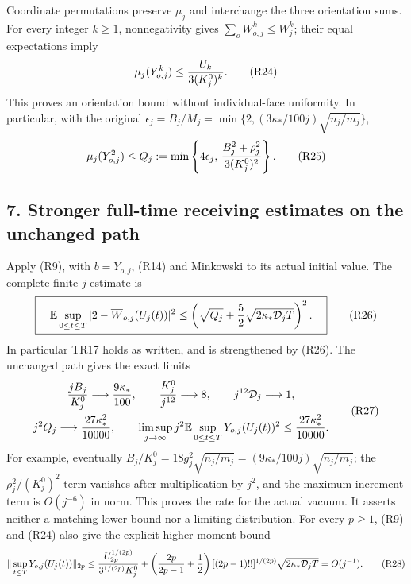 \documentclass[11pt]{article}
\begin{document}
Coordinate permutations preserve \(\mu_j\) and interchange the
three orientation sums. For every integer \(k\ge1\), nonnegativity
gives \(\sum_o W_{o,j}^k\le W_j^k\); their equal expectations imply
\[
 \mu_j(Y_{o,j}^k)\le{U_k\over3(K_j^0)^k}.
 \tag{R24}
\]
This proves an orientation bound without individual-face uniformity.
In particular, with the original
\(\epsilon_j=B_j/M_j=\min\{2,(3\kappa_*/100j)\sqrt{n_j/m_j}\}\),
\[
 \mu_j(Y_{o,j}^2)\le Q_j:=
 \min\left\{4\epsilon_j,\,
        {B_j^2+\rho_j^2\over3(K_j^0)^2}\right\}. \tag{R25}
\]

\subsection*{7. Stronger full-time receiving estimates on the unchanged path}

Apply (R9), with \(b=Y_{o,j}\), (R14) and Minkowski to its actual
initial value. The complete finite-\(j\) estimate is
\[
 \boxed{\quad
 \mathbb E\sup_{0\le t\le T}|2-\overline W_{o,j}(U_j(t))|^2
 \le\left(\sqrt{Q_j}
       +{5\over2}\sqrt{2\kappa_*\mathcal D_jT}\right)^2.
 \quad}\tag{R26}
\]
In particular TR17 holds as written, and is strengthened by (R26).
The unchanged path gives the exact limits
\[
\begin{gathered}
 {jB_j\over K_j^0}\longrightarrow {9\kappa_*\over100},\qquad
 {K_j^0\over j^{12}}\longrightarrow8,\qquad
 j^{12}\mathcal D_j\longrightarrow1,\\
 j^2Q_j\longrightarrow{27\kappa_*^2\over10000},\qquad
 \limsup_{j\to\infty}j^2
 \mathbb E\sup_{0\le t\le T}Y_{o,j}(U_j(t))^2
 \le{27\kappa_*^2\over10000}.
\end{gathered}\tag{R27}
\]
For example, eventually
\(B_j/K_j^0=18g_j^2\sqrt{n_j/m_j}
=(9\kappa_*/100j)\sqrt{n_j/m_j}\);
the \(\rho_j^2/(K_j^0)^2\) term vanishes after multiplication by
\(j^2\), and the maximum increment term is \(O(j^{-6})\) in norm.
This proves the rate for the actual vacuum. It asserts neither a
matching lower bound nor a limiting distribution.
For every \(p\ge1\), (R9) and (R24) also give the explicit higher
moment bound
\[
 \|\sup_{t\le T}Y_{o,j}(U_j(t))\|_{2p}
 \le {U_{2p}^{1/(2p)}\over3^{1/(2p)}K_j^0}
 +\left({2p\over2p-1}+{1\over2}\right)
 [(2p-1)!!]^{1/(2p)}
 \sqrt{2\kappa_*\mathcal D_jT}=O(j^{-1}).
 \tag{R28}
\]
\end{document}
